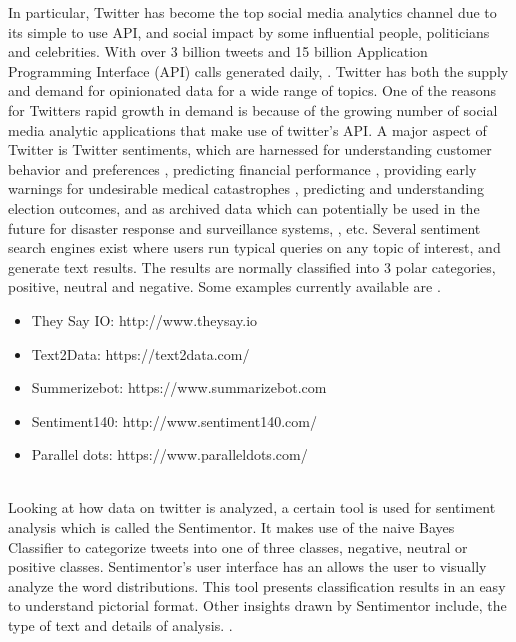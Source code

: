 In particular, Twitter has become the top social media analytics channel due to its simple to use API, and social impact by some influential people, politicians and celebrities. With over 3 billion tweets and 15 billion Application Programming Interface (API) calls generated daily, \cite{ref8}. Twitter has both the supply and demand for opinionated data for a wide range of topics. One of the reasons for Twitters rapid growth in demand is because of the growing number of social media analytic applications  that make use of twitter's API. A major aspect of Twitter is Twitter sentiments, which are harnessed for understanding customer behavior and preferences \cite{ref11}, predicting financial performance \cite{ref9}, providing early warnings for undesirable medical catastrophes \cite{ref10}, predicting and understanding election outcomes\cite{ref12}, and as archived data which can potentially be used in the future for disaster response and surveillance systems, \cite{ref13}, etc. Several sentiment search engines exist where users run typical queries on any topic of interest, and generate text results. The results are normally classified into 3 polar categories, positive, neutral and negative. Some examples currently available are \cite{ref14}.

\begin{itemize}

\item They Say IO:  http://www.theysay.io
\item Text2Data:  https://text2data.com/
\item Summerizebot:  https://www.summarizebot.com
\item Sentiment140: http://www.sentiment140.com/
\item Parallel dots: https://www.paralleldots.com/

\end{itemize}
\leavevmode\\
Looking at how data on twitter is analyzed, a certain tool is used for sentiment analysis which is called the Sentimentor. It makes use of the naive Bayes Classifier to categorize tweets into one of three classes, negative, neutral or positive classes. Sentimentor's user interface has an allows the user to visually analyze the word distributions. This tool presents classification results in an easy to understand pictorial format. Other insights drawn by Sentimentor include, the type of text and details of analysis. \cite{ref15}.


